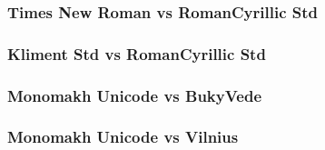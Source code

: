 \documentclass[12pt]{article}
\begin{document}
\subsubsection{Times New Roman vs RomanCyrillic Std}


\subsubsection{Kliment Std vs RomanCyrillic Std}

 
\subsubsection{Monomakh Unicode vs BukyVede}

 
\subsubsection{Monomakh Unicode vs Vilnius}

 
\pagebreak\tableofcontents
\end{document}
